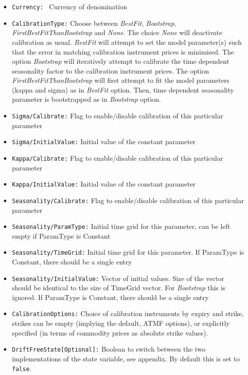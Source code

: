 \begin{itemize}
\item {\tt Currency: } Currency of denomination
\item {\tt CalibrationType:} Choose between {\em BestFit},  {\em Bootstrap},  {\em FirstBestFitThanBootstrap}  and {\em None}.  The choice {\em None} will deactivate calibration as usual. {\em BestFit} will attempt to set the model parameter(s) such that the error in matching calibration instrument prices is minimised.  The option {\em Bootstrap} will iteratively attempt to calibrate the time dependent seasonality factor to the calibration instrument prices. The option {\em FirstBestFitThanBootstrap} will first attempt to fit the model parameters (kappa and sigma) as in {\em BestFit} option. Then, time dependent seasonality parameter is bootstrapped as in {\em Bootstrap} option.
\item {\tt Sigma/Calibrate:} Flag to enable/disable calibration of this particular parameter
\item {\tt Sigma/InitialValue:} Initial value of the constant parameter
\item {\tt Kappa/Calibrate:} Flag to enable/disable calibration of this particular parameter
\item {\tt Kappa/InitialValue:} Initial value of the constant parameter
\item {\tt Seasonality/Calibrate:} Flag to enable/disable calibration of this particular parameter
\item {\tt Seasonality/ParamType:} Initial time grid for this parameter, can be left empty if ParamType is Constant
\item {\tt Seasonality/TimeGrid:} Initial time grid for this parameter. If ParamType is Constant, there should be a single entry
\item {\tt Seasonality/InitialValue:} Vector of initial values. Size of the vector should be identical to the size of TimeGrid vector.  For {\em Bootstrap} this is ignored.  If ParamType is Constant, there should be a single entry
\item {\tt CalibrationOptions:} Choice of calibration instruments by expiry and strike, strikes can be empty 	(implying the default, ATMF options), or explicitly specified (in terms of commodity prices as absolute strike values).
\item {\tt DriftFreeState[Optional]:} Boolean to switch between the two implementations of the state variable, see appendix. By default this is set to {\tt false}.
\end{itemize}

